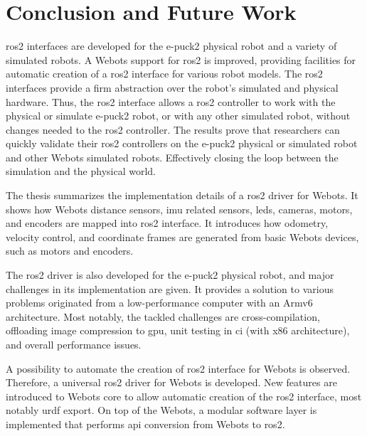 \chapter{Conclusion and Future Work}
\label{chap:conclusion}

\ac{ros2} interfaces are developed for the e-puck2 physical robot and a variety of simulated robots.
A Webots support for \ac{ros2} is improved, providing facilities for automatic creation of a \ac{ros2} interface for various robot models.
The \ac{ros2} interfaces provide a firm abstraction over the robot's simulated and physical hardware. 
Thus, the \ac{ros2} interface allows a \ac{ros2} controller to work with the physical or simulate e-puck2 robot, or with any other simulated robot, without changes needed to the \ac{ros2} controller.
The results prove that researchers can quickly validate their \ac{ros2} controllers on the e-puck2 physical or simulated robot and other Webots simulated robots.
Effectively closing the loop between the simulation and the physical world.

The thesis summarizes the implementation details of a \ac{ros2} driver for Webots.
It shows how Webots distance sensors, \ac{imu} related sensors, \acp{led}, cameras, motors, and encoders are mapped into \ac{ros2} interface.
It introduces how odometry, velocity control, and coordinate frames are generated from basic Webots devices, such as motors and encoders.

The \ac{ros2} driver is also developed for the e-puck2 physical robot, and major challenges in its implementation are given.
It provides a solution to various problems originated from a low-performance computer with an Armv6 architecture. 
Most notably, the tackled challenges are cross-compilation, offloading image compression to \ac{gpu}, unit testing in \ac{ci} (with x86 architecture), and overall performance issues.

A possibility to automate the creation of \ac{ros2} interface for Webots is observed.
Therefore, a universal \ac{ros2} driver for Webots is developed.
New features are introduced to Webots core to allow automatic creation of the \ac{ros2} interface, most notably \ac{urdf} export.
On top of the Webots, a modular software layer is implemented that performs \ac{api} conversion from Webots to \ac{ros2}.


